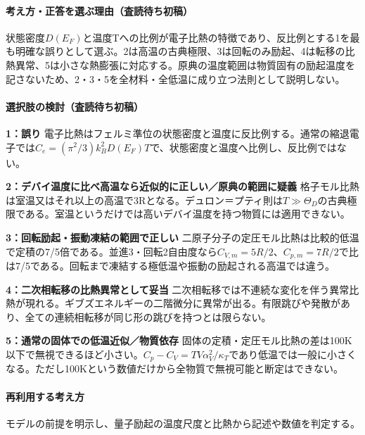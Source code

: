 \paragraph{考え方・正答を選ぶ理由（査読待ち初稿）} 状態密度\(D(E_F)\)と温度Tへの比例が電子比熱の特徴であり、反比例とする1を最も明確な誤りとして選ぶ。2は高温の古典極限、3は回転のみ励起、4は転移の比熱異常、5は小さな熱膨張に対応する。原典の温度範囲は物質固有の励起温度を記さないため、2・3・5を全材料・全低温に成り立つ法則として説明しない。

\paragraph{選択肢の検討（査読待ち初稿）}\mbox{}\par

\noindent\textbf{1：誤り} 電子比熱はフェルミ準位の状態密度と温度に反比例する。通常の縮退電子では\(C_e=(\pi^2/3)k_B^2D(E_F)T\)で、状態密度と温度へ比例し、反比例ではない。\par

\noindent\textbf{2：デバイ温度に比べ高温なら近似的に正しい／原典の範囲に疑義} 格子モル比熱は室温又はそれ以上の高温で3Rとなる。デュロン＝プティ則は\(T\gg\Theta_D\)の古典極限である。室温というだけでは高いデバイ温度を持つ物質には適用できない。\par

\noindent\textbf{3：回転励起・振動凍結の範囲で正しい} 二原子分子の定圧モル比熱は比較的低温で定積の7/5倍である。並進3・回転2自由度なら\(C_{V,m}=5R/2\)、\(C_{p,m}=7R/2\)で比は7/5である。回転まで凍結する極低温や振動の励起される高温では違う。\par

\noindent\textbf{4：二次相転移の比熱異常として妥当} 二次相転移では不連続な変化を伴う異常比熱が現れる。ギブズエネルギーの二階微分に異常が出る。有限跳びや発散があり、全ての連続相転移が同じ形の跳びを持つとは限らない。\par

\noindent\textbf{5：通常の固体での低温近似／物質依存} 固体の定積・定圧モル比熱の差は100K以下で無視できるほど小さい。\(C_p-C_V=TV\alpha_V^2/\kappa_T\)であり低温では一般に小さくなる。ただし100Kという数値だけから全物質で無視可能と断定はできない。\par

\paragraph{再利用する考え方} モデルの前提を明示し、量子励起の温度尺度と比熱から記述や数値を判定する。

